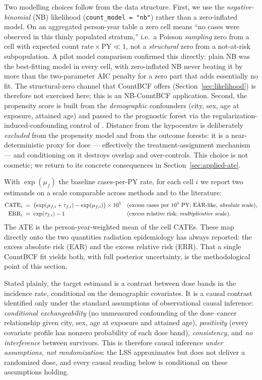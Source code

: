 \documentclass[11pt]{article}
\begin{document}
Two modelling choices follow from the data structure. First, we use the
\emph{negative-binomial} (NB) likelihood (\texttt{count\_model = "nb"})
rather than a zero-inflated model. On an aggregated person-year table a zero
cell means ``no cases were observed in this thinly populated stratum,'' i.e.\
a Poisson \emph{sampling} zero from a cell with expected count
$\text{rate}\times\text{PY}\ll 1$, not a \emph{structural} zero from a
not-at-risk subpopulation. A pilot model comparison confirmed this directly:
plain NB was the best-fitting model in every cell, with zero-inflated NB
never beating it by more than the two-parameter AIC penalty for a zero part
that adds essentially no fit. The structural-zero channel that CountBCF
offers (Section~\ref{sec:likelihood}) is therefore not exercised here; this
is an NB-CountBCF application. Second, the propensity score is built from the
\emph{demographic} confounders (city, sex, age at exposure, attained age) and
passed to the prognostic forest via the regularization-induced-confounding
control of \citet{hahn2020bayesian}. Distance from the hypocentre is
deliberately \emph{excluded} from the propensity model and from the outcome
forests: it is a near-deterministic proxy for dose --- effectively the
treatment-assignment mechanism --- and conditioning on it destroys overlap
and over-controls. This choice is not cosmetic; we return to its concrete
consequences in Section~\ref{sec:applied-ate}.

With $\exp(\mu_f)$ the baseline cases-per-PY rate, for each cell $i$ we report
two estimands on a scale comparable across methods and to the literature:
\begin{align}
\text{CATE}_i \;&=\; \bigl(\exp(\mu_{f,i}+\tau_{f,i}) - \exp(\mu_{f,i})\bigr)\times 10^5
   && \text{(excess cases per } 10^5 \text{ PY; EAR-like, \emph{absolute} scale),}\\
\text{ERR}_i \;&=\; \exp(\tau_{f,i}) - 1
   && \text{(excess relative risk; \emph{multiplicative} scale).}
\end{align}
The ATE is the person-year-weighted mean of the cell CATEs. These map
directly onto the two quantities radiation epidemiology has always reported:
the excess absolute risk (EAR) and the excess relative risk (ERR). That a
single CountBCF fit yields both, with full posterior uncertainty, is the
methodological point of this section.

Stated plainly, the target estimand is a contrast between dose bands in the
incidence rate, conditional on the demographic covariates. It is a causal
contrast identified only under the standard assumptions of observational
causal inference: \emph{conditional exchangeability} (no unmeasured
confounding of the dose--cancer relationship given city, sex, age at exposure
and attained age), \emph{positivity} (every covariate profile has nonzero
probability of each dose band), \emph{consistency}, and \emph{no interference}
between survivors. This is therefore causal inference \emph{under assumptions,
not randomization}: the LSS approximates but does not deliver a randomized
dose, and every causal reading below is conditional on these assumptions
holding.
\end{document}
